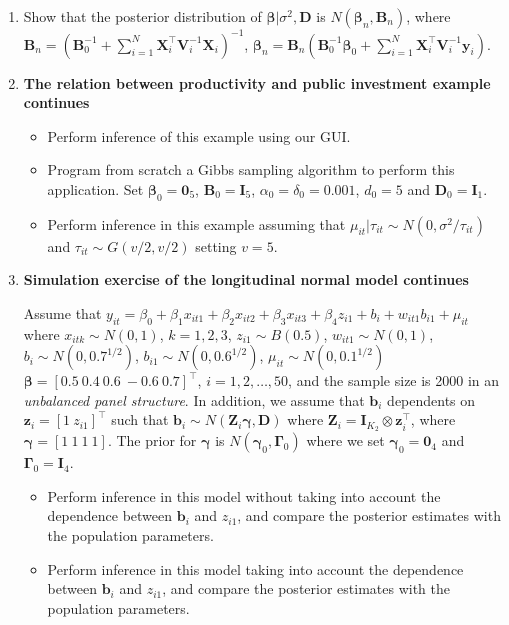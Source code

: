 \begin{enumerate}
	
	\item Show that the posterior distribution of $\bm{\beta}|\sigma^2,\bm{D}$ is $N(\bm{\beta}_n,\bm{B}_n)$, where $\bm{B}_n = (\bm{B}_0^{-1} +\sum_{i=1}^N \bm{X}_i^{\top}\bm{V}_i^{-1}\bm{X}_i)^{-1}$, $\bm{\beta}_n= \bm{B}_n(\bm{B}_0^{-1}\bm{\beta}_0 + \sum_{i=1}^N\bm{X}_i^{\top}\bm{V}_i^{-1}\bm{y}_i)$.
	
	\item \textbf{The relation between productivity and public investment example continues}
	
	\begin{itemize}
		\item Perform inference of this example using our GUI.
		\item Program from scratch a Gibbs sampling algorithm to perform this application. Set $\bm{\beta}_0=\bm{0}_5$, $\bm{B}_0=\bm{I}_5$, $\alpha_0=\delta_0=0.001$, $d_0=5$ and $\bm{D}_0=\bm{I}_1$.
		\item Perform inference in this example assuming that $\mu_{it}|\tau_{it}\sim N(0, \sigma^2/\tau_{it})$ and $\tau_{it}\sim G(v/2,v/2)$ setting $v=5$. 
	\end{itemize}
  
	\item \textbf{Simulation exercise of the longitudinal normal model continues}
	
	
	Assume that $y_{it}=\beta_0+\beta_1x_{it1}+\beta_2x_{it2}+\beta_3x_{it3}+\beta_4 z_{i1}+b_i+w_{it1}b_{i1}+\mu_{it}$ where $x_{itk}\sim N(0,1)$, $k=1,2,3$, $z_{i1}\sim B(0.5)$, $w_{it1}\sim N(0,1)$, $b_i\sim N(0, 0.7^{1/2})$, $b_{i1}\sim N(0, 0.6^{1/2})$, $\mu_{it}\sim N(0, 0.1^{1/2})$ $\bm{\beta}=[0.5 \ 0.4 \ 0.6 \ -0.6 \ 0.7]^{\top}$, $i=1,2,\dots,50$, and the sample size is 2000 in an \textit{unbalanced panel structure}. In addition, we assume that $\bm{b}_i$ dependents on $\bm{z}_i=[1 \ z_{i1}]^{\top}$ such that $\bm{b}_i\sim N(\bm{Z}_i\bm{\gamma},\bm{D})$ where $\bm{Z}_i=\bm{I}_{K_2}\otimes \bm{z}_i^{\top}$, where $\bm{\gamma}=[1 \ 1 \ 1 \ 1]$. The prior for $\bm{\gamma}$ is $N(\bm{\gamma}_0,\bm{\Gamma}_0)$ where we set $\bm{\gamma}_0=\bm{0}_4$ and $\bm{\Gamma}_0=\bm{I}_4$. 
	
	\begin{itemize}
		\item Perform inference in this model without taking into account the dependence between $\bm{b}_i$ and $z_{i1}$, and compare the posterior estimates with the population parameters.
		\item Perform inference in this model taking into account the dependence between $\bm{b}_i$ and $z_{i1}$, and compare the posterior estimates with the population parameters. 
	\end{itemize}


\end{enumerate}
